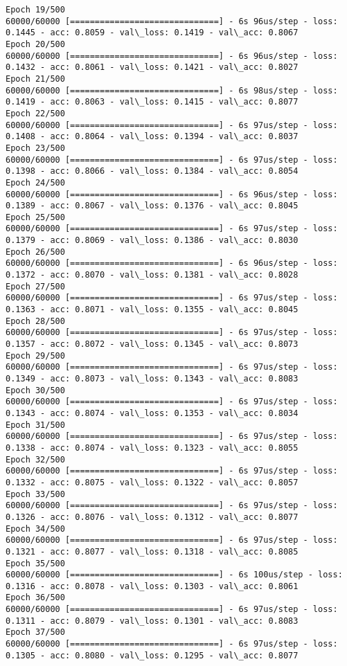 \documentclass[11pt]{article}
\begin{document}
\begin{Verbatim}[commandchars=\\\{\}]
Epoch 19/500
60000/60000 [==============================] - 6s 96us/step - loss: 0.1445 - acc: 0.8059 - val\_loss: 0.1419 - val\_acc: 0.8067
Epoch 20/500
60000/60000 [==============================] - 6s 96us/step - loss: 0.1432 - acc: 0.8061 - val\_loss: 0.1421 - val\_acc: 0.8027
Epoch 21/500
60000/60000 [==============================] - 6s 98us/step - loss: 0.1419 - acc: 0.8063 - val\_loss: 0.1415 - val\_acc: 0.8077
Epoch 22/500
60000/60000 [==============================] - 6s 97us/step - loss: 0.1408 - acc: 0.8064 - val\_loss: 0.1394 - val\_acc: 0.8037
Epoch 23/500
60000/60000 [==============================] - 6s 97us/step - loss: 0.1398 - acc: 0.8066 - val\_loss: 0.1384 - val\_acc: 0.8054
Epoch 24/500
60000/60000 [==============================] - 6s 96us/step - loss: 0.1389 - acc: 0.8067 - val\_loss: 0.1376 - val\_acc: 0.8045
Epoch 25/500
60000/60000 [==============================] - 6s 97us/step - loss: 0.1379 - acc: 0.8069 - val\_loss: 0.1386 - val\_acc: 0.8030
Epoch 26/500
60000/60000 [==============================] - 6s 96us/step - loss: 0.1372 - acc: 0.8070 - val\_loss: 0.1381 - val\_acc: 0.8028
Epoch 27/500
60000/60000 [==============================] - 6s 97us/step - loss: 0.1363 - acc: 0.8071 - val\_loss: 0.1355 - val\_acc: 0.8045
Epoch 28/500
60000/60000 [==============================] - 6s 97us/step - loss: 0.1357 - acc: 0.8072 - val\_loss: 0.1345 - val\_acc: 0.8073
Epoch 29/500
60000/60000 [==============================] - 6s 97us/step - loss: 0.1349 - acc: 0.8073 - val\_loss: 0.1343 - val\_acc: 0.8083
Epoch 30/500
60000/60000 [==============================] - 6s 97us/step - loss: 0.1343 - acc: 0.8074 - val\_loss: 0.1353 - val\_acc: 0.8034
Epoch 31/500
60000/60000 [==============================] - 6s 97us/step - loss: 0.1338 - acc: 0.8074 - val\_loss: 0.1323 - val\_acc: 0.8055
Epoch 32/500
60000/60000 [==============================] - 6s 97us/step - loss: 0.1332 - acc: 0.8075 - val\_loss: 0.1322 - val\_acc: 0.8057
Epoch 33/500
60000/60000 [==============================] - 6s 97us/step - loss: 0.1326 - acc: 0.8076 - val\_loss: 0.1312 - val\_acc: 0.8077
Epoch 34/500
60000/60000 [==============================] - 6s 97us/step - loss: 0.1321 - acc: 0.8077 - val\_loss: 0.1318 - val\_acc: 0.8085
Epoch 35/500
60000/60000 [==============================] - 6s 100us/step - loss: 0.1316 - acc: 0.8078 - val\_loss: 0.1303 - val\_acc: 0.8061
Epoch 36/500
60000/60000 [==============================] - 6s 97us/step - loss: 0.1311 - acc: 0.8079 - val\_loss: 0.1301 - val\_acc: 0.8083
Epoch 37/500
60000/60000 [==============================] - 6s 97us/step - loss: 0.1305 - acc: 0.8080 - val\_loss: 0.1295 - val\_acc: 0.8077

\end{Verbatim}
\end{document}
